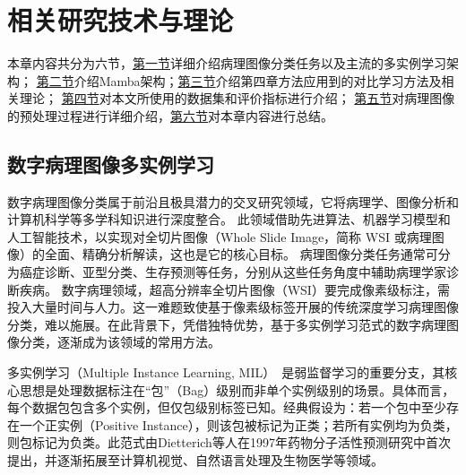 \chapter[\hspace{0pt}相关研究技术与理论]{{\heiti{}\hspace{0pt}相关研究技术与理论}}

\removelofgap
\removelotgap

本章内容共分为六节，\hyperref[section2: 数字病理图像多实例学习]{第一节}详细介绍病理图像分类任务以及主流的多实例学习架构；
\hyperref[section2: Mamba架构]{第二节}介绍Mamba架构；\hyperref[section2: 对比学习]{第三节}介绍第四章方法应用到的对比学习方法及相关理论；
\hyperref[section2: 数据集及评价指标]{第四节}对本文所使用的数据集和评价指标进行介绍；
\hyperref[section2: 病理图像的预处理过程]{第五节}对病理图像的预处理过程进行详细介绍，\hyperref[section2: 本章小结]{第六节}对本章内容进行总结。

\section[\hspace{-2pt}数字病理图像多实例学习]{{\heiti{} \hspace{-8pt}数字病理图像多实例学习}}\label{section2: 数字病理图像多实例学习}

数字病理图像分类属于前沿且极具潜力的交叉研究领域，它将病理学、图像分析和计算机科学等多学科知识进行深度整合。
此领域借助先进算法、机器学习模型和人工智能技术，以实现对全切片图像（Whole Slide Image，简称 WSI 或病理图像）的全面、精确分析解读，这也是它的核心目标。 
病理图像分类任务通常可分为癌症诊断、亚型分类、生存预测等任务，分别从这些任务角度中辅助病理学家诊断疾病。
数字病理领域，超高分辨率全切片图像（WSI）要完成像素级标注，需投入大量时间与人力。这一难题致使基于像素级标签开展的传统深度学习病理图像分类，难以施展。在此背景下，凭借独特优势，基于多实例学习范式的数字病理图像分类，逐渐成为该领域的常用方法。

多实例学习（Multiple Instance Learning, MIL）~\cite{dietterich1997solving}是弱监督学习的重要分支，其核心思想是处理数据标注在“包”（Bag）级别而非单个实例级别的场景。具体而言，每个数据包包含多个实例，但仅包级别标签已知。经典假设为：若一个包中至少存在一个正实例（Positive Instance），则该包被标记为正类；若所有实例均为负类，则包标记为负类。此范式由Dietterich等人在1997年药物分子活性预测研究中首次提出，并逐渐拓展至计算机视觉、自然语言处理及生物医学等领域。

